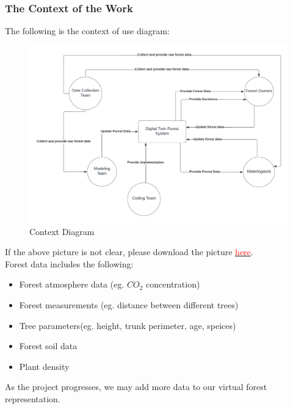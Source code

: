 \documentclass{article}
\begin{document}
\subsubsection{The Context of the Work}
The following is the context of use diagram:
\begin{figure}[H]
\begin{center}
\includegraphics[scale=0.7]{SRS_Pictures/Context_Use.png}
\end{center}
\caption{Context Diagram}
\end{figure}

\noindent If the above picture is not clear, please download the picture \href{https://github.com/wuj187/DigitalTwinCAS/blob/main/docs/SRS/SRS_Pictures/Context_Use.png}{\textcolor{red}{here}}. \\

\noindent Forest data includes the following:
\begin{itemize}
    \item Forest atmosphere data (eg. $CO_2$ concentration)
    \item Forest measurements (eg. distance between different trees)
    \item Tree parameters(eg. height, trunk perimeter, age, speices)
    \item Forest soil data
    \item Plant density
\end{itemize}
As the project progresses, we may add more data to our virtual forest representation.
\end{document}
